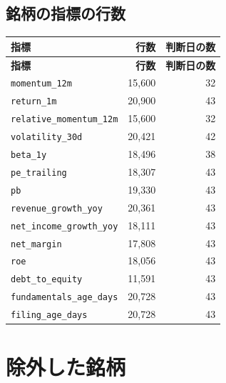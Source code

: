 \documentclass[xelatex,ja=standard,jafont=hiragino-pron,a4paper,10pt]{bxjsreport}
\begin{document}
\section{銘柄の指標の行数}

{\small
\begin{longtable}{p{5.00cm}rr}
\toprule
\textbf{指標} & \textbf{行数} & \textbf{判断日の数} \\
\midrule
\endfirsthead
\toprule
\textbf{指標} & \textbf{行数} & \textbf{判断日の数} \\
\midrule
\endhead
\bottomrule
\endfoot
\texttt{momentum\_\allowbreak{}12m} & 15,600 & 32 \\
\texttt{return\_\allowbreak{}1m} & 20,900 & 43 \\
\texttt{relative\_\allowbreak{}momentum\_\allowbreak{}12m} & 15,600 & 32 \\
\texttt{volatility\_\allowbreak{}30d} & 20,421 & 42 \\
\texttt{beta\_\allowbreak{}1y} & 18,496 & 38 \\
\texttt{pe\_\allowbreak{}trailing} & 18,307 & 43 \\
\texttt{pb} & 19,330 & 43 \\
\texttt{revenue\_\allowbreak{}growth\_\allowbreak{}yoy} & 20,361 & 43 \\
\texttt{net\_\allowbreak{}income\_\allowbreak{}growth\_\allowbreak{}yoy} & 18,111 & 43 \\
\texttt{net\_\allowbreak{}margin} & 17,808 & 43 \\
\texttt{roe} & 18,056 & 43 \\
\texttt{debt\_\allowbreak{}to\_\allowbreak{}equity} & 11,591 & 43 \\
\texttt{fundamentals\_\allowbreak{}age\_\allowbreak{}days} & 20,728 & 43 \\
\texttt{filing\_\allowbreak{}age\_\allowbreak{}days} & 20,728 & 43 \\
\end{longtable}
}

\chapter{除外した銘柄}\label{app:excluded}
\end{document}
